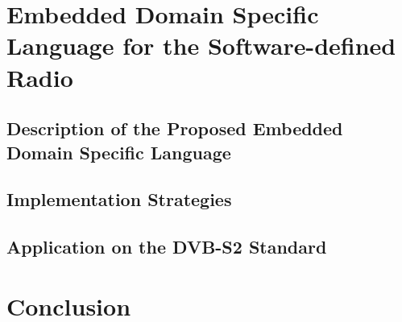 \documentclass[t, compress, mathserif, 10pt, xcolor=dvipsnames, table, aspectratio=43]{beamer}
\begin{document}
\section[eDSL for the SDR]{Embedded Domain Specific Language for the Software-defined Radio}

\subsection[Description of the Proposed Embedded Domain Specific Language]{Description of the Proposed Embedded Domain Specific Language}

\subsection[Implementation Strategies]{Implementation Strategies}

\subsection[Application on the DVB-S2 Standard]{Application on the DVB-S2 Standard}

\section[Conclusion]{Conclusion}
\end{document}

